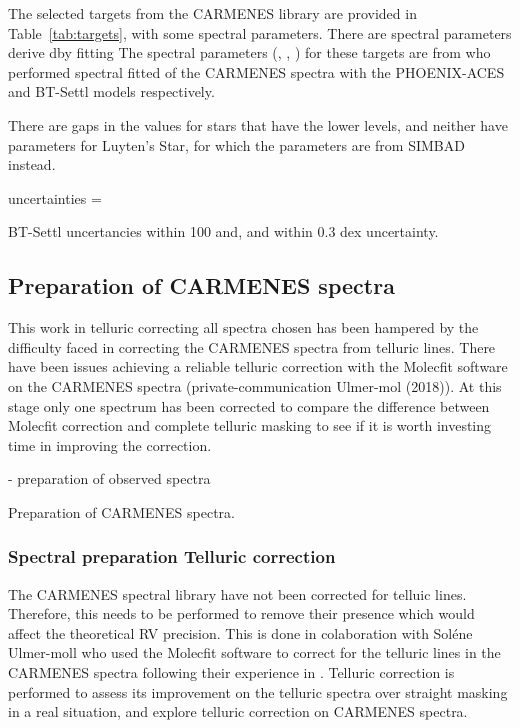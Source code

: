 The selected targets from the {CARMENES} library are provided in Table~\ref{tab:targets}, with some spectral parameters.
There are spectral parameters derive dby fitting
The spectral parameters (\Teff{}, \Logg{}, \feh{}) for these targets are from \citep{passegger_carmenes_2018, rajpurohit_exploring_2018} who performed spectral fitted of the {CARMENES} spectra with the PHOENIX-ACES and BT-Settl models respectively.

There are gaps in the \citet{passegger_carmenes_2018} values for stars that have the lower \snr{} levels, and neither have parameters for Luyten's Star, for which the parameters are from SIMBAD instead.

\citep{passegger_carmenes_2018} uncertainties = 

BT-Settl uncertancies \Teff{} within 100 \K{} and, \Logg{} and \feh{} within 0.3 dex uncertainty.

\begin{landscape}
    
\end{landscape}


\subsection{Preparation of {CARMENES} spectra}
\label{subsec:prepatation_on_carmenes}
This work in telluric correcting all spectra chosen has been hampered by the difficulty faced in correcting the CARMENES spectra from telluric lines.
There have been issues achieving a reliable telluric correction with the Molecfit software on the {CARMENES} spectra (private-communication Ulmer-mol (2018)).
At this stage only one spectrum has been corrected to compare the difference between Molecfit correction and complete telluric masking to see if it is worth investing time in improving the correction.


- preparation of observed spectra

Preparation of {CARMENES} spectra.



\subsubsection{Spectral preparation Telluric correction}
\label{subsec:prepatation_on_carmenes}
The CARMENES spectral library have not been corrected for telluic lines.
Therefore, this needs to be performed to remove their presence which would affect the theoretical RV precision.
This is done in colaboration with Sol\'ene Ulmer-moll who used the Molecfit software \citep{smette_molecfit_2015} to correct for the telluric lines in the CARMENES spectra following their experience in \citet{ulmer-moll_telluric_2018}. 
Telluric correction is performed to assess its improvement on the telluric spectra over straight masking in a real situation, and explore telluric correction on CARMENES spectra.
 

